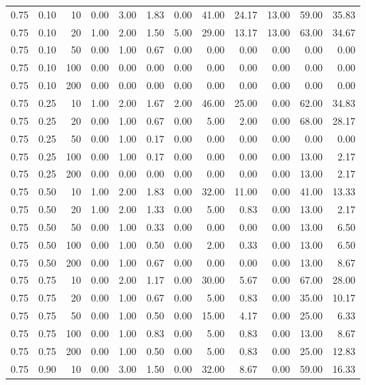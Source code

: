 \documentclass{bmstu}
\begin{document}
\begin{longtable}{|r|r|r|r|r|r|r|r|r|r|r|r|}
\hline
0.75 & 0.10 & 10 & 0.00 & 3.00 & 1.83 & 0.00 & 41.00 & 24.17 & 13.00 & 59.00 & 35.83  \\
0.75 & 0.10 & 20 & 1.00 & 2.00 & 1.50 & 5.00 & 29.00 & 13.17 & 13.00 & 63.00 & 34.67  \\
0.75 & 0.10 & 50 & 0.00 & 1.00 & 0.67 & 0.00 & 0.00 & 0.00 & 0.00 & 0.00 & 0.00  \\
0.75 & 0.10 & 100 & 0.00 & 0.00 & 0.00 & 0.00 & 0.00 & 0.00 & 0.00 & 0.00 & 0.00  \\
0.75 & 0.10 & 200 & 0.00 & 0.00 & 0.00 & 0.00 & 0.00 & 0.00 & 0.00 & 0.00 & 0.00  \\
\hline
0.75 & 0.25 & 10 & 1.00 & 2.00 & 1.67 & 2.00 & 46.00 & 25.00 & 0.00 & 62.00 & 34.83  \\
0.75 & 0.25 & 20 & 0.00 & 1.00 & 0.67 & 0.00 & 5.00 & 2.00 & 0.00 & 68.00 & 28.17  \\
0.75 & 0.25 & 50 & 0.00 & 1.00 & 0.17 & 0.00 & 0.00 & 0.00 & 0.00 & 0.00 & 0.00  \\
0.75 & 0.25 & 100 & 0.00 & 1.00 & 0.17 & 0.00 & 0.00 & 0.00 & 0.00 & 13.00 & 2.17  \\
0.75 & 0.25 & 200 & 0.00 & 0.00 & 0.00 & 0.00 & 0.00 & 0.00 & 0.00 & 13.00 & 2.17  \\
\hline
0.75 & 0.50 & 10 & 1.00 & 2.00 & 1.83 & 0.00 & 32.00 & 11.00 & 0.00 & 41.00 & 13.33  \\
0.75 & 0.50 & 20 & 1.00 & 2.00 & 1.33 & 0.00 & 5.00 & 0.83 & 0.00 & 13.00 & 2.17  \\
0.75 & 0.50 & 50 & 0.00 & 1.00 & 0.33 & 0.00 & 0.00 & 0.00 & 0.00 & 13.00 & 6.50  \\
0.75 & 0.50 & 100 & 0.00 & 1.00 & 0.50 & 0.00 & 2.00 & 0.33 & 0.00 & 13.00 & 6.50  \\
0.75 & 0.50 & 200 & 0.00 & 1.00 & 0.67 & 0.00 & 0.00 & 0.00 & 0.00 & 13.00 & 8.67  \\
\hline
0.75 & 0.75 & 10 & 0.00 & 2.00 & 1.17 & 0.00 & 30.00 & 5.67 & 0.00 & 67.00 & 28.00  \\
0.75 & 0.75 & 20 & 0.00 & 1.00 & 0.67 & 0.00 & 5.00 & 0.83 & 0.00 & 35.00 & 10.17  \\
0.75 & 0.75 & 50 & 0.00 & 1.00 & 0.50 & 0.00 & 15.00 & 4.17 & 0.00 & 25.00 & 6.33  \\
0.75 & 0.75 & 100 & 0.00 & 1.00 & 0.83 & 0.00 & 5.00 & 0.83 & 0.00 & 13.00 & 8.67  \\
0.75 & 0.75 & 200 & 0.00 & 1.00 & 0.50 & 0.00 & 5.00 & 0.83 & 0.00 & 25.00 & 12.83  \\
\hline
0.75 & 0.90 & 10 & 0.00 & 3.00 & 1.50 & 0.00 & 32.00 & 8.67 & 0.00 & 59.00 & 16.33  \\

\end{longtable}
\end{document}

